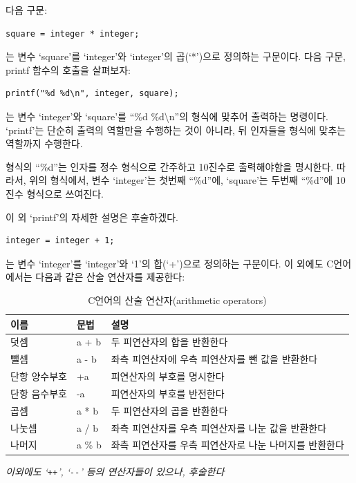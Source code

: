 \documentclass[a4paper,12pt]{book}
\begin{document}
다음 구문:

\begin{lstlisting}
square = integer * integer;
\end{lstlisting}

는 변수 `square'를 `integer'와 `integer'의 곱(`*')으로 정의하는 구문이다.
다음 구문, printf 함수의 호출을 살펴보자:

\begin{lstlisting}
printf("%d %d\n", integer, square);
\end{lstlisting}

는 변수 `integer'와 `square'를 ``\%d \%d\textbackslash{}n''의 형식에 맞추어 출력하는 명령이다.
`printf'는 단순히 출력의 역할만을 수행하는 것이 아니라,
뒤 인자들을 형식에 맞추는 역할까지 수행한다.

형식의 ``\%d''는 인자를 정수 형식으로 간주하고 10진수로 출력해야함을 명시한다.
따라서, 위의 형식에서, 변수 `integer'는 첫번째 ``\%d''에,
`square'는 두번째 ``\%d''에 10진수 형식으로 쓰여진다.

이 외 `printf'의 자세한 설명은 후술하겠다.

\begin{lstlisting}
integer = integer + 1;
\end{lstlisting}

는 변수 `integer'를 `integer'와 `1'의 합(`+')으로 정의하는 구문이다.
이 외에도 C언어에서는 다음과 같은 산술 연산자를 제공한다:

\begin{table}[H]
    \centering

    \caption{C언어의 산술 연산자(arithmetic operators)}
    \label{Tab:arithmetic-operators}

    \begin{tabular}{ || m{7em} | m{3em} | m{19em} || }
        \hline
        이름 & 문법 & 설명 \\
        \hline\hline
        덧셈        & a + b & 두 피연산자의 합을 반환한다 \\
        \hline
        뺄셈        & a - b & 좌측 피연산자에 우측 피연산자를 뺀 값을 반환한다 \\
        \hline
        단항 양수부호 & +a    & 피연산자의 부호를 명시한다 \\
        \hline
        단항 음수부호 & -a    & 피연산자의 부호를 반전한다 \\
        \hline
        곱셈        & a * b & 두 피연산자의 곱을 반환한다 \\
        \hline
        나눗셈      & a / b  & 좌측 피연산자를 우측 피연산자를 나눈 값을 반환한다 \\
        \hline
        나머지      & a \% b & 좌측 피연산자를 우측 피연산자로 나눈 나머지를 반환한다 \\
        \hline
    \end{tabular}
    \newline
    \textit{\color{gray} \small 이외에도 `\Verb|++|', `\Verb|--|' 등의 연산자들이 있으나, 후술한다}
\end{table}
\end{document}
